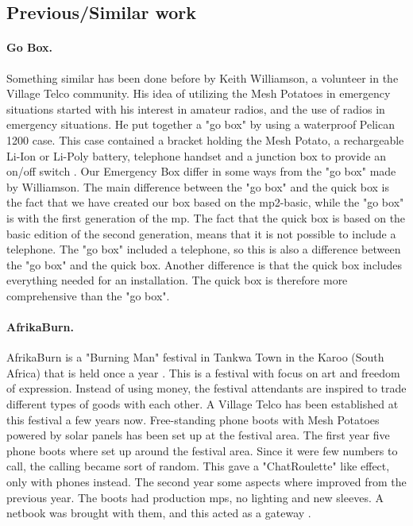  
\subsection{Previous/Similar work}
\paragraph{Go Box.} Something similar has been done before by Keith Williamson, a volunteer in the Village Telco community. His idea of utilizing the Mesh Potatoes in emergency situations started with his interest in amateur radios, and the use of radios in emergency situations. He put together a "go box" by using a waterproof Pelican 1200 case. This case contained a bracket holding the Mesh Potato, a rechargeable Li-Ion or Li-Poly battery, telephone handset and a junction box to provide an on/off switch \cite{keith}. Our Emergency Box differ in some ways from the "go box" made by Williamson. The main difference between the "go box" and the \gls{quick} box is the fact that we have created our box based on the \gls{mp2}-basic, while the "go box" is with the first generation of the \gls{mp}. The fact that the \gls{quick} box is based on the basic edition of the second generation, means that it is not possible to include a telephone. The "go box" included a telephone, so this is also a difference between the "go box" and the \gls{quick} box. Another difference is that the \gls{quick} box includes everything needed for an installation. The \gls{quick} box is therefore more comprehensive than the "go box".

\paragraph{AfrikaBurn.}
AfrikaBurn is a "Burning Man" festival in Tankwa Town in the Karoo (South Africa) that is held once a year \cite{whatisafrikaburn}. This is a festival with focus on art and freedom of expression. Instead of using money, the festival attendants are inspired to trade different types of goods with each other. A Village Telco has been established at this festival a few years now. Free-standing phone boots with Mesh Potatoes powered by solar panels has been set up at the festival area. The first year five phone boots where set up around the festival area. Since it were few numbers to call, the calling became sort of random. This gave a  "ChatRoulette" like effect, only with phones instead. The second year some aspects where improved from the previous year. The boots had production \glspl{mp}, no lighting and new sleeves. A netbook was brought with them, and this acted as a gateway \cite{africaburnforavillagetelco,africaburnsagainforavillagetelco}. 

